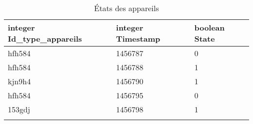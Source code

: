 \documentclass[10pt,a4paper]{article}
\begin{document}
\begin{table}[h!]
\caption{Identification/interprétation des types d'appareils}
\end{table}
\begin{table}[h!]
\centering
    \begin{tabular}{|l|l|l|}
    \hline
    \rowcolor[HTML]{EFEFEF} 
    integer Id\_type\_appareils & integer Timestamp & boolean State \\ \hline
    hfh584                               & 1456787           & 0             \\ \hline
    hfh584                               & 1456788           & 1             \\ \hline
    kjn9h4                               & 1456790           & 1             \\ \hline
    hfh584                               & 1456795           & 0             \\ \hline
    153gdj                               & 1456798           & 1             \\ \hline	 &                   &              
    \end{tabular}
    \caption{États des appareils}
\end{table}
\end{document}
